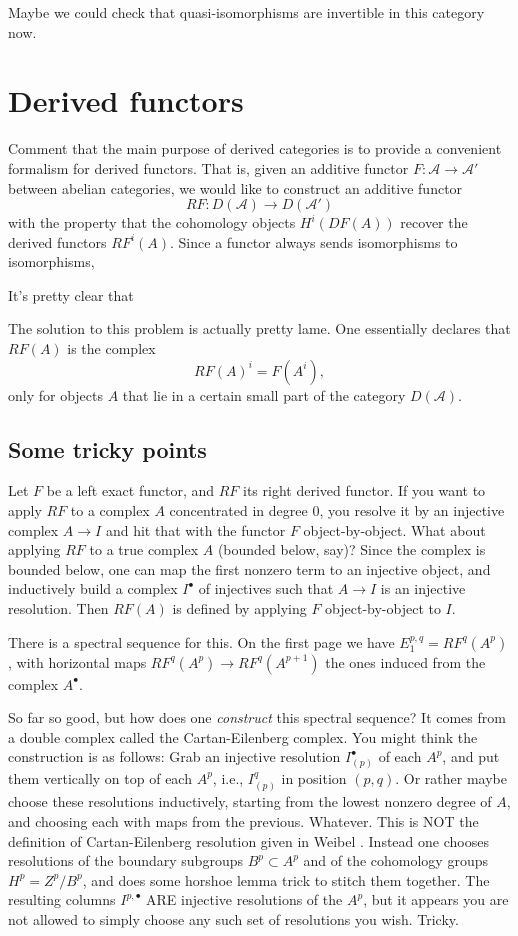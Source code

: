 \documentclass[12pt]{article}
\theoremstyle{plain}
\theoremstyle{definition}
\numberwithin{equation}{section}
\newcommand{\CA}{\mathcal{A}}
\begin{document}
Maybe we could check that quasi-isomorphisms are invertible in this category now.


\section{Derived functors}



Comment that the main purpose of derived categories is to provide a convenient formalism for derived functors. That is, given an additive functor $F : \CA \rightarrow \CA'$ between abelian categories, we would like to construct an additive functor
\[
RF : D(\CA) \rightarrow D(\CA')
\]
with the property that the cohomology objects $H^i(DF(A))$ recover the derived functors $RF^i(A)$. Since a functor always sends isomorphisms to isomorphisms,

It's pretty clear that

The solution to this problem is actually pretty lame. One essentially declares that $RF(A)$ is the complex
\[
RF(A)^i = F(A^i),
\]
only for objects $A$ that lie in a certain small part of the category $D(\CA)$.



\subsection{Some tricky points}


Let $F$ be a left exact functor, and $RF$ its right derived functor. If you want to apply $RF$ to a complex $A$ concentrated in degree $0$, you resolve it by an injective complex $A \rightarrow I$ and hit that with the functor $F$ object-by-object. What about applying $RF$ to a true complex $A$ (bounded below, say)? Since the complex is bounded below, one can map the first nonzero term to an injective object, and inductively build a complex $I^\bullet$ of injectives such that $A \rightarrow I$ is an injective resolution. Then $RF(A)$ is defined by applying $F$ object-by-object to $I$.

There is a spectral sequence for this. On the first page we have $E_1^{p, q} = RF^q(A^p)$, with horizontal maps $RF^q(A^p) \rightarrow RF^q(A^{p+1})$ the ones induced from the complex $A^\bullet$.

So far so good, but how does one \emph{construct} this spectral sequence? It comes from a double complex called the Cartan-Eilenberg complex. You might think the construction is as follows: Grab an injective resolution $I^\bullet_{(p)}$ of each $A^p$, and put them vertically on top of each $A^p$, i.e., $I^q_{(p)}$ in position $(p, q)$. Or rather maybe choose these resolutions inductively, starting from the lowest nonzero degree of $A$, and choosing each with maps from the previous. Whatever. This is NOT the definition of Cartan-Eilenberg resolution given in Weibel {\cite[Definition 5.7.1]{Weibel}}. Instead one chooses resolutions of the boundary subgroups $B^p \subset A^p$ and of the cohomology groups $H^p = Z^p / B^p$, and does some horshoe lemma trick to stitch them together. The resulting columns $I^{p, \bullet}$ ARE injective resolutions of the $A^p$, but it appears you are not allowed to simply choose any such set of resolutions you wish. Tricky.
\end{document}
